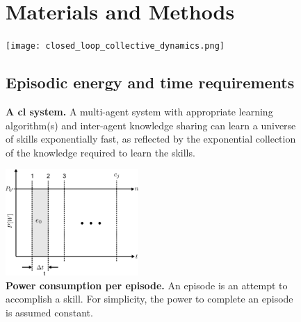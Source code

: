 \begin{figure}[t!]
	\centering\section{Materials and Methods}\label{sec:materials_and_methods}
	\hspace*{\fill}
	\texttt{[image: closed\_loop\_collective\_dynamics.png]}%
	\hspace*{\fill}\subsection{Episodic energy and time requirements}\label{sec:power_per_episode}
	\caption[] {\label{fig:collective_learning_system} \textbf{A \acl{cl} system.} {A multi-agent system with appropriate learning algorithm(s) and inter-agent knowledge sharing can learn a universe of skills exponentially fast, as reflected by the exponential collection of the knowledge required to learn the skills.}}%
\end{figure}\begin{figure}[!h]
	\includegraphics[width=0.45\textwidth]{fig/power_per_episode.png}
	\caption{\textbf{Power consumption per episode.} An episode is an attempt to accomplish a skill. For simplicity, the power to complete an episode is assumed constant.}	
	\label{fig:power_per_episode}
\end{figure}
